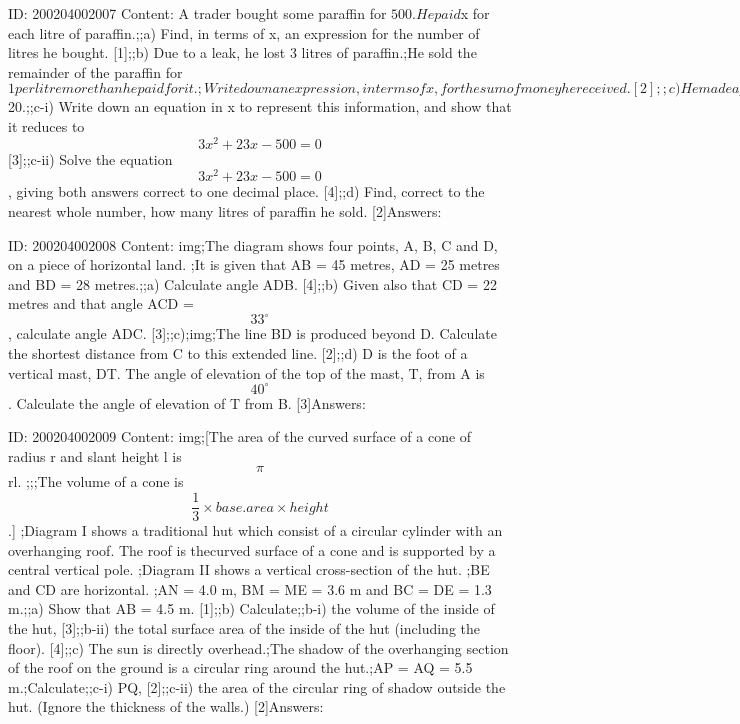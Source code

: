 \documentclass{article}
\begin{document}
ID: 200204002007
Content:
A trader bought some paraffin for $500. He paid $x for each litre of paraffin.;;a) Find, in terms of x, an expression for the number of litres he bought.   [1];;b) Due to a leak, he lost 3 litres of paraffin.;He sold the remainder of the paraffin for $1 per litre more than he paid for it.;Write down an expression, in terms of x, for the sum of money he received.   [2];;c) He made a profit of $20.;;c-i) Write down an equation in x to represent this information, and show that it reduces to $$3x^2 + 23x - 500 = 0$$ [3];;c-ii) Solve the equation $$3x^2 + 23x - 500 = 0$$, giving both answers correct to one decimal place.   [4];;d) Find, correct to the nearest whole number, how many litres of paraffin he sold.   [2]Answers:

ID: 200204002008
Content:
img;The diagram shows four points, A, B, C and D, on a piece of horizontal land. ;It is given that AB = 45 metres, AD = 25 metres and BD = 28 metres.;;a) Calculate angle ADB.   [4];;b) Given also that CD = 22 metres and that angle ACD = $$33^{\circ}$$, calculate angle ADC.   [3];;c);img;The line BD is produced beyond D. Calculate the shortest distance from C to this extended line.   [2];;d) D is the foot of a vertical mast, DT. The angle of elevation of the top of the mast, T, from A is $$40^{\circ}$$. Calculate the angle of elevation of T from B.   [3]Answers:

ID: 200204002009
Content:
img;[The area of the curved surface of a cone of radius r and slant height l is $$\pi$$ rl. ;;;The volume of a cone is $$\frac{1}{3} \times base.area \times height$$.] ;Diagram I shows a traditional hut which consist of a circular cylinder with an overhanging roof. The roof is thecurved surface of a cone and is supported by a central vertical pole. ;Diagram II shows a vertical cross-section of the hut. ;BE and CD are horizontal. ;AN = 4.0 m, BM = ME = 3.6 m and BC = DE = 1.3 m.;;a) Show that AB = 4.5 m.   [1];;b) Calculate;;b-i) the volume of the inside of the hut,   [3];;b-ii) the total surface area of the inside of the hut (including the floor).   [4];;c) The sun is directly overhead.;The shadow of the overhanging section of the roof on the ground is a circular ring around the hut.;AP = AQ = 5.5 m.;Calculate;;c-i) PQ,   [2];;c-ii) the area of the circular ring of shadow outside the hut. (Ignore the thickness of the walls.)   [2]Answers:
\end{document}
